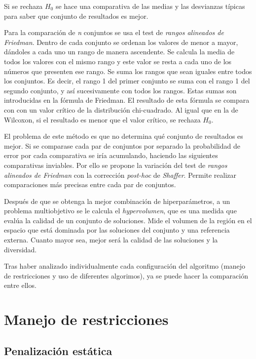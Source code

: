 Si se rechaza \(H_0\) se hace una comparativa de las medias y las desvianzas típicas para saber que conjunto de resultados es mejor.

Para la comparación de \textit{n} conjuntos se usa el test de \textit{rangos alineados de Friedman}. Dentro de cada conjunto se ordenan los valores de menor a mayor, dándoles a cada uno un rango de manera ascendente. Se calcula la media de todos los valores con el mismo rango y este valor se resta a cada uno de los números que presenten ese rango. Se suma los rangos que sean iguales entre todos los conjuntos. Es decir, el rango 1 del primer conjunto se suma con el rango 1 del segundo conjunto, y así sucesivamente con todos los rangos. Estas sumas son introducidas en la fórmula de Friedman. El resultado de esta fórmula se compara con con un valor crítico de la distribución chi-cuadrado. Al igual que en la de Wilcoxon, si el resultado es menor que el valor crítico, se rechaza \(H_0\).~\cite{stac2024friedman}

El problema de este método es que no determina qué conjunto de resultados es mejor. Si se comparase cada par de conjuntos por separado la probabilidad de error por cada comparativa se iría acumulando, haciendo las siguientes comparativas inviables. Por ello se propone la variación del test de \textit{rangos alineados de Friedman} con la corrección \textit{post-hoc} de \textit{Shaffer}. Permite realizar comparaciones más precisas entre cada par de conjuntos.~\cite{stac2024shaffer}

Después de que se obtenga la mejor combinación de hiperparámetros, a un problema multiobjetivo se le calcula el \textit{hypervolumen}, que es una medida que evalúa la calidad de un conjunto de soluciones. Mide el volumen de la región en el espacio que está dominada por las soluciones del conjunto y una referencia externa. Cuanto mayor sea, mejor será la calidad de las soluciones y la diversidad.~\cite{pymoo2024hypervolume}

Tras haber analizado individualmente cada configuración del algoritmo (manejo de restricciones y uso de diferentes algorimos), ya se puede hacer la comparación entre ellos.

\section{Manejo de restricciones}
\label{ch:manejo-restricciones}

\subsection{Penalización estática}
\label{ch:penalizacion-estatica}

